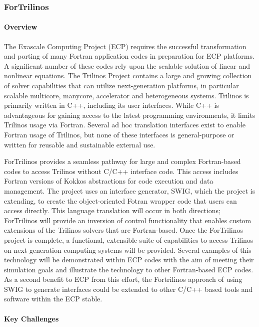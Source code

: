 \subsubsection{ForTrilinos}

\paragraph{Overview}

The Exascale Computing Project (ECP) requires the successful transformation and porting of many Fortran application codes in preparation for ECP platforms. A significant number of these codes rely upon the scalable solution of linear and nonlinear equations. The Trilinos Project contains a large and growing collection of solver capabilities that can utilize next-generation platforms, in particular scalable multicore, manycore, accelerator and heterogeneous systems. Trilinos is primarily written in C++, including its user interfaces. While C++ is advantageous for gaining access to the latest programming environments, it limits Trilinos usage via Fortran. Several ad hoc translation interfaces exist to enable Fortran usage of Trilinos, but none of these interfaces is general-purpose or written for reusable and sustainable external use.

ForTrilinos provides a seamless pathway for large and complex Fortran-based codes to access Trilinos without C/C++ interface code. This access includes Fortran versions of Kokkos abstractions for code execution and data management. The project uses an interface generator, SWIG, which the project is extending, to create the object-oriented Fotran wrapper code that users can access directly. This language translation will occur in both directions; ForTrilinos will provide an inversion of control functionality that enables custom extensions of the Trilinos solvers that are Fortran-based. Once the ForTrilinos project is complete, a functional, extensible suite of capabilities to access Trilinos on next-generation computing systems will be provided. Several examples of this technology will be demonstrated within ECP codes with the aim of meeting their simulation goals and illustrate the technology to other Fortran-based ECP codes. As a second benefit to ECP from this effort, the Fortrilinos approach of using SWIG to generate interfaces could be extended to other C/C++ based tools and software within the ECP stable.

\paragraph{Key  Challenges}

